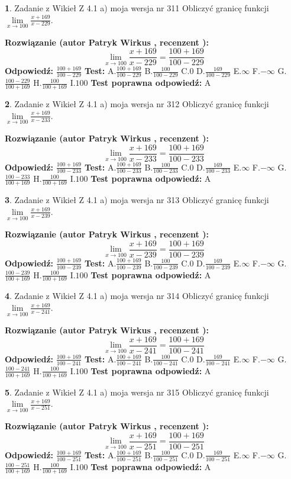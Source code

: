 \documentclass[12pt, a4paper]{article}
\theoremstyle{definition} %
\newtheorem{zad}{}
\newcommand{\zadStart}[1]{\begin{zad}#1\newline}
\newcommand{\zadStop}{\end{zad}}
\newcommand{\rozwStart}[2]{\noindent \textbf{Rozwiązanie (autor #1 , recenzent #2): }\newline}
\newcommand{\rozwStop}{\newline}
\newcommand{\odpStart}{\noindent \textbf{Odpowiedź:}\newline}
\newcommand{\odpStop}{\newline}
\newcommand{\testStart}{\noindent \textbf{Test:}\newline}
\newcommand{\testStop}{\newline}
\newcommand{\kluczStart}{\noindent \textbf{Test poprawna odpowiedź:}\newline}
\newcommand{\kluczStop}{\newline}
\begin{document}
\zadStart{Zadanie z Wikieł Z 4.1 a) moja wersja nr 311}
Obliczyć granicę funkcji $\lim\limits_{x\to100}\frac{x+169}{x-229}$.
\zadStop
\rozwStart{Patryk Wirkus}{}
$$\lim\limits_{x\to100}\frac{x+169}{x-229} = \frac{100+169}{100-229}$$
\rozwStop
\odpStart
$\frac{100+169}{100-229}$
\odpStop
\testStart
A.$\frac{100+169}{100-229}$
B.$\frac{100}{100-229}$
C.$0$
D.$\frac{169}{100-229}$
E.$\infty$
F.$-\infty$
G.$\frac{100-229}{100+169}$
H.$\frac{100}{100+169}$
I.$100$
\testStop
\kluczStart
A
\kluczStop



\zadStart{Zadanie z Wikieł Z 4.1 a) moja wersja nr 312}
Obliczyć granicę funkcji $\lim\limits_{x\to100}\frac{x+169}{x-233}$.
\zadStop
\rozwStart{Patryk Wirkus}{}
$$\lim\limits_{x\to100}\frac{x+169}{x-233} = \frac{100+169}{100-233}$$
\rozwStop
\odpStart
$\frac{100+169}{100-233}$
\odpStop
\testStart
A.$\frac{100+169}{100-233}$
B.$\frac{100}{100-233}$
C.$0$
D.$\frac{169}{100-233}$
E.$\infty$
F.$-\infty$
G.$\frac{100-233}{100+169}$
H.$\frac{100}{100+169}$
I.$100$
\testStop
\kluczStart
A
\kluczStop



\zadStart{Zadanie z Wikieł Z 4.1 a) moja wersja nr 313}
Obliczyć granicę funkcji $\lim\limits_{x\to100}\frac{x+169}{x-239}$.
\zadStop
\rozwStart{Patryk Wirkus}{}
$$\lim\limits_{x\to100}\frac{x+169}{x-239} = \frac{100+169}{100-239}$$
\rozwStop
\odpStart
$\frac{100+169}{100-239}$
\odpStop
\testStart
A.$\frac{100+169}{100-239}$
B.$\frac{100}{100-239}$
C.$0$
D.$\frac{169}{100-239}$
E.$\infty$
F.$-\infty$
G.$\frac{100-239}{100+169}$
H.$\frac{100}{100+169}$
I.$100$
\testStop
\kluczStart
A
\kluczStop



\zadStart{Zadanie z Wikieł Z 4.1 a) moja wersja nr 314}
Obliczyć granicę funkcji $\lim\limits_{x\to100}\frac{x+169}{x-241}$.
\zadStop
\rozwStart{Patryk Wirkus}{}
$$\lim\limits_{x\to100}\frac{x+169}{x-241} = \frac{100+169}{100-241}$$
\rozwStop
\odpStart
$\frac{100+169}{100-241}$
\odpStop
\testStart
A.$\frac{100+169}{100-241}$
B.$\frac{100}{100-241}$
C.$0$
D.$\frac{169}{100-241}$
E.$\infty$
F.$-\infty$
G.$\frac{100-241}{100+169}$
H.$\frac{100}{100+169}$
I.$100$
\testStop
\kluczStart
A
\kluczStop



\zadStart{Zadanie z Wikieł Z 4.1 a) moja wersja nr 315}
Obliczyć granicę funkcji $\lim\limits_{x\to100}\frac{x+169}{x-251}$.
\zadStop
\rozwStart{Patryk Wirkus}{}
$$\lim\limits_{x\to100}\frac{x+169}{x-251} = \frac{100+169}{100-251}$$
\rozwStop
\odpStart
$\frac{100+169}{100-251}$
\odpStop
\testStart
A.$\frac{100+169}{100-251}$
B.$\frac{100}{100-251}$
C.$0$
D.$\frac{169}{100-251}$
E.$\infty$
F.$-\infty$
G.$\frac{100-251}{100+169}$
H.$\frac{100}{100+169}$
I.$100$
\testStop
\kluczStart
A
\kluczStop
\end{document}
